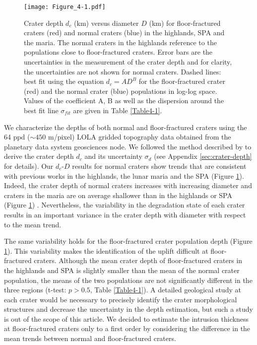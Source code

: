 \begin{figure}[h!]
  \graphicspath{ {/Users/thorey/Documents/These/Projet/FFC/Gravi_GRAIL/Article/Papier/Proof/} }
  \begin{center}

    \texttt{[image: Figure\_4-1.pdf]}

    \caption{Crater  depth $d_c$  (km)  versus diameter  $D$ (km)  for
      floor-fractured craters  (red) and normal craters  (blue) in the
      highlands,  SPA  and  the  maria.  The  normal  craters  in  the
      highlands reference to the  populations close to floor-fractured
      craters.  Error bars are the uncertainties in the measurement of
      the  crater depth  and for  clarity, the  uncertainties are  not
      shown  for normal  craters.  Dashed  lines: best  fit using  the
      equation $d_c =  AD^B$ for the floor-fractured  crater (red) and
      the normal  crater (blue) populations in  log-log space.  Values
      of the  coefficient A, B  as well  as the dispersion  around the
      best fit line $\sigma_{fit}$ are given in Table \ref{Table4-1}.}
    \label{C6-Figure4-1}
  \end{center}
\end{figure}


We characterize the depths of  both normal and floor-fractured craters
using  the 64  ppd ($\sim450$  m/pixel) LOLA  gridded topography  data
\citep{Zuber:2009bq}   obtained  from   the   planetary  data   system
geosciences   node.     We   followed   the   method    described   by
\citet{Kalynn:2013fg}  to  derive  the  crater  depth  $d_c$  and  its
uncertainty  $\sigma_{d}$  (see  Appendix  \ref{sec:crater-depth}  for
details).  Our $d_c$-$D$  results for normal craters  show trends that
are consistent with  previous works in the highlands,  the lunar maria
and the SPA (Figure \ref{C6-Figure4-1}).   Indeed, the crater depth of
normal craters increases  with increasing diameter and  craters in the
maria are  on average shallower than  in the highlands or  SPA (Figure
\ref{C6-Figure4-1})     \citep{Pike:1974ux,Pike:1980eh,Kalynn:2013fg}.
Nevertheless, the variability in the  degradation state of each crater
results in  an important  variance in the  crater depth  with diameter
with respect to the mean trend.

The same  variability holds for the  floor-fractured crater population
depth  (Figure   \ref{C6-Figure4-1}).   This  variability   makes  the
identification   of   the    uplift   difficult   at   floor-fractured
craters. Although the mean crater  depth of floor-fractured craters in
the highlands and SPA is slightly  smaller than the mean of the normal
crater  population,  the   means  of  the  two   populations  are  not
significantly different in the three  regions (t-test: $p> 0.5$, Table
\ref{Table4-1}).  A detailed geological study  at each crater would be
necessary to  precisely identify  the crater  morphological structures
and decrease the uncertainty in the depth estimation, but such a study
is  out of  the scope  of this  article.  We  decided to  estimate the
intrusion thickness at  floor-fractured craters only to  a first order
by considering  the difference in  the mean trends between  normal and
floor-fractured craters.

